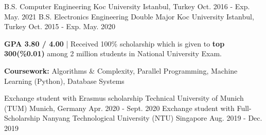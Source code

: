\begin{cventries}

\cventry
    {B.S. Computer Engineering} %
    {Koc University } %
    {Istanbul, Turkey} %
    {Oct. 2016 - Exp. May. 2021} %
    {}
\vspace{-4mm}
\cventry
    {B.S. Electronics Engineering Double Major} %
    {Koc University } %
    {Istanbul, Turkey} %
    {Oct. 2015 - Exp. May. 2020} %
    {
      \begin{cvitems} %
        \item {\textbf{GPA 3.80 / 4.00} | Received 100\% scholarship which is given to \textbf{top 300(\%0.01)} among 2 million students in National University Exam.}
        \item {\textbf{Coursework:} Algorithms \& Complexity, Parallel Programming, Machine Learning (Python), Database Systems}
      \end{cvitems}
    }
\cventry
    {Exchange student with Erasmus scholarship }
    {Technical University of Munich (TUM)} %
    {Munich, Germany} %
    {Apr. 2020 - Sept. 2020} %
    {}
\cventry
    {Exchange student with Full-Scholarship}
    {Nanyang Technological University (NTU)} %
    {Singapore} %
    {Aug. 2019 - Dec. 2019} %
    {}
\vspace{2mm}    
\end{cventries}

